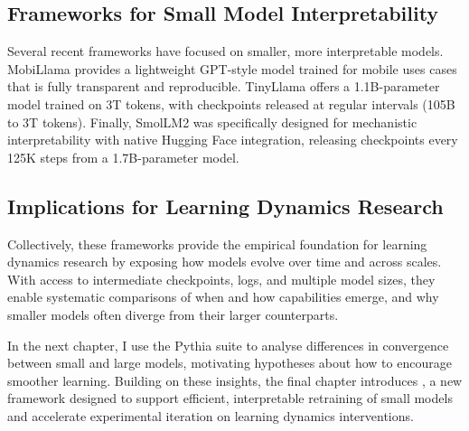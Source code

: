 \subsection{Frameworks for Small Model Interpretability}

Several recent frameworks have focused on smaller, more interpretable models. MobiLlama \citep{thawakar2024mobillama} provides a lightweight GPT-style model trained for mobile uses cases that is fully transparent and reproducible. TinyLlama \citep{liu2023llm360} offers a 1.1B-parameter model trained on 3T tokens, with checkpoints released at regular intervals (105B to 3T tokens). Finally, SmolLM2 \citep{allal2025smollm2} was specifically designed for mechanistic interpretability with native Hugging Face integration, releasing checkpoints every 125K steps from a 1.7B-parameter model. 

\subsection{Implications for Learning Dynamics Research}

Collectively, these frameworks provide the empirical foundation for learning dynamics research by exposing how models evolve over time and across scales. With access to intermediate checkpoints, logs, and multiple model sizes, they enable systematic comparisons of when and how capabilities emerge, and why smaller models often diverge from their larger counterparts.

In the next chapter, I use the Pythia suite to analyse differences in convergence between small and large models, motivating hypotheses about how to encourage smoother learning. Building on these insights, the final chapter introduces \pico, a new framework designed to support efficient, interpretable retraining of small models and accelerate experimental iteration on learning dynamics interventions.
